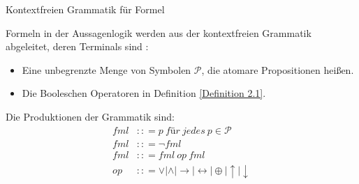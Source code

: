 \begin{defi} \label{Definition 2.13}Kontextfreien Grammatik für Formel \end{defi} Formeln in der Aussagenlogik werden aus der kontextfreien Grammatik abgeleitet, deren Terminals sind \cite{Ben-Ari}:
\begin{itemize}
\item  Eine unbegrenzte Menge von Symbolen $\mathcal{P}$, die atomare Propositionen heißen.
\item  Die Booleschen Operatoren in Definition \ref{Definition 2.1}.
\end{itemize}
Die Produktionen der Grammatik sind:
\begin{align*}
fml &:: = p \ für \ jedes \ p \in  \mathcal{P}\\
fml &:: = \neg fml\\
fml &:: = fml \  op \ fml\\
op &:: = \vee | \wedge | \rightarrow  |\leftrightarrow | \oplus | \uparrow | \downarrow
\end{align*}
























